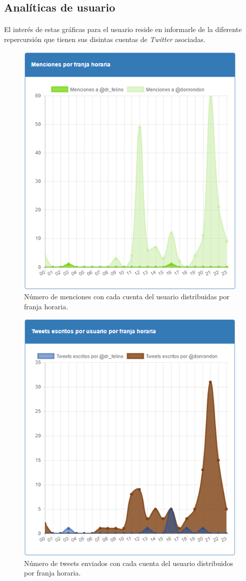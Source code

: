 \documentclass[a4paper]{article}
\begin{document}
	\subsection{Analíticas de usuario} 

		\paragraph{} El interés de estas gráficas para el usuario reside en informarle de la diferente repercursión que tienen sus disintas cuentas de \textit{Twitter} asociadas. 
		
			\begin{figure}[H]
				\centering
				\includegraphics[width=0.6\linewidth]{img/mencionesHoras}
				\caption{Número de menciones con cada cuenta del usuario distribuidas por franja horaria.}
				\label{fig:mencionesHoras}
			\end{figure}
			
			\begin{figure}[H]
				\centering
				\includegraphics[width=0.6\linewidth]{img/tweetsHoras}
				\caption{Número de tweets enviados con cada cuenta del usuario distribuidos por franja horaria.}
				\label{fig:tweetsHoras}
			\end{figure}
			
\end{document}
